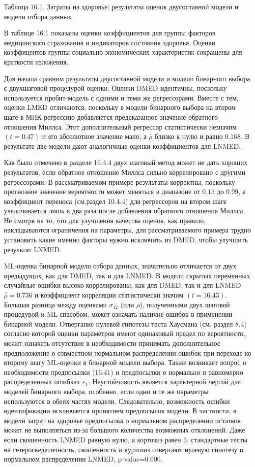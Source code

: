 Таблица 16.1. Затраты на здоровье: результаты оценок двусоставной модели и модели отбора данных


В таблице 16.1  показаны оценки коэффициентов для группы факторов медицинского страхования и индикаторов состояния здоровья. Оценки коэффицентов группы социально-экономических характеристик сокращены для краткости изложения.

Для начала сравним результаты двусоставной модели и модели бинарного выбора с двухшаговой процедурой оценки. Оценки DMED идентичны, поскольку используется пробит-модель с одними и теми же регрессорами. Вместе с тем, оценки LMED отличаются, поскольку в модели бинарного выбора на втором шаге в МНК регрессию добавляется предсказанное значение обратного отношения Миллса. Этот дополнительный регрессор статистически незначим $(t=0.47)$ и его абсолютное значение мало, а $\hat{\rho}$ близко к нулю и равно $0.168$. В результате две модели дают аналогичные оценки коэффициентов для LNMED.


Как было отмечено в разделе 16.4.4 двух шаговый метод может не дать хороших результатов, если обратное отношение Миллса сильно коррелировано с другими регрессорами. В рассматриваемом примере результаты корректны, поскольку прогнозное значение вероятности может меняться в диапазоне от $0.15$ до $0.99$, а коэффициент переноса (см.раздел 10.4.4) для регрессоров на втором шаге	увеличивается лишь в два раза после добавления обратного отношения Миллса. Не смотря на то, что для улучшения качества оценок, как правило, накладываются ограничения на параметры, для рассматриваемого примера трудно установить какие именно факторы нужно исключить из DMED, чтобы улучшить результат LNMED.

ML-оценка бинарной модели отбора данных, значительно отличается от двух предыдущих, как для DMED, так и для LNMED. В модели скрытых переменных случайные ошибки высоко коррелированы, как для DMED, так и для LNMED $\hat{\rho}=0.736$ и коэффициент корреляции статистически значим $(t=16.43)$. Большая разница между оценками $\sigma_{12}$ (или $\rho$), полученными двух шаговой процедурой и ML-спасобом,  может означать наличие ошибок в применении бинарной модели. Отвергание нулевой гипотезы теста Хаусмана (см. раздел 8.4) согласно которой оценки параметров имеют одинаковый предел по вероятности, может означать отсутствие в необходимости принимать дополнительное предположение о совместном нормальном распределении ошибок при переходе ко второму шагу ML-оценки в бинарной модели выбора. Также возникает вопрос о необходимости предпосылки (16.41) и предпосылки о нормально и равномерно распределенных ошибках $\varepsilon_1$. Неустойчивость является характерной чертой для моделей бинарного выбора, особенно, если одни и те же параметры используются в обеих частях модели. Следовательно, возможность ошибки идентификации исключается принятием предпосылок модели. В частности, в модели затрат на здоровье предпосылка о нормальном распределении остатков может не выполняться из-за большого количества возможных отклонений. Даже если  скошенность LNMED равную нулю, а кортозиз равен $3$, стандартные тесты на гетероскедатичность, скошенность и куртозиз отвергают нулевую гипотезу о нормальном распределении LNMED, p-value=0.000.


